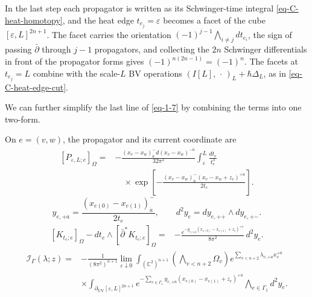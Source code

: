 \documentclass[11pt]{article}
\numberwithin{equation}{section}
\numberwithin{figure}{section}
\numberwithin{table}{section}
\begin{document}
In the last step each propagator is written as its Schwinger-time integral \eqref{eq-C-heat-homotopy}, and the heat edge $t_{e_j}=\varepsilon$ becomes a facet of the cube $[\varepsilon,L]^{2n+1}$. The facet carries the orientation $(-1)^{j-1}\bigwedge_{i\ne j}dt_{e_i}$, the sign of passing $\bar\partial$ through $j-1$ propagators, and collecting the $2n$ Schwinger differentials in front of the propagator forms gives $(-1)^{n(2n-1)}=(-1)^n$. The facets at $t_{e_j}=L$ combine with the scale-$L$ BV operations $(I[L],\,\cdot\,)_L+\hbar\Delta_L$, as in \eqref{eq-C-heat-edge-cut}.

We can further simplify the last line of \eqref{eq-1-7} by combining the terms into one two-form.

On $e=(v,w)$, the propagator and its current coordinate are
\begin{equation}\label{eq-C-explicit-propagator}
\begin{aligned}
[P_{\varepsilon,L;e}]_\Omega
={}&-\frac{(x_v-x_w)^-_{\dot a}
 d(x_v-x_w)^{-\dot a}}{32\pi^2}
 \int_\varepsilon^L\frac{dt_e}{t_e^3}\\
&\quad\times\exp\!\left[-\frac{
 (x_v-x_w)^-_{\dot a}(x_v-x_w+z_e)^{+\dot a}}{2t_e}\right].
\end{aligned}
\end{equation}
\begin{equation}\label{eq-1-8}
y_{e,+\dot a}
=\frac{(x_{e(0)}-x_{e(1)})^-_{\dot a}}{2t_e},\qquad
 d^2y_e=dy_{e,+\dot+}\wedge dy_{e,+\dot-}.
\end{equation}
\begin{equation}\label{eq-C-current-Jacobian}
\begin{aligned}
[K_{t_e;e}]_\Omega
-dt_e\wedge[\bar\partial^*K_{t_e;e}]_\Omega
={}&-\frac{e^{-y_{e,+\dot a}
 (x_{e(0)}-x_{e(1)}+z_e)^{+\dot a}}}{8\pi^2}\,d^2y_e.
\end{aligned}
\end{equation}
\begin{equation}\label{eq-kernel-current-form}
\begin{aligned}
\mathcal I_\Gamma(\lambda;z)
={}&-\frac{1}{(8\pi^2)^{n+1}}\lim_{\varepsilon\downarrow0}
\int_{(\mathbb C^2)^{n+1}}
\left(\bigwedge_{v<n+2}\Omega_v\right)
e^{\sum_{v<n+2}\lambda_{v,+\dot a}x_v^{+\dot a}}\\
&\times\int_{\partial_{\mathrm{UV}}[\varepsilon,L]^{2n+1}}
e^{-\sum_{e\in\Gamma_1}y_{e,+\dot a}(x_{e(0)}-x_{e(1)}+z_e)^{+\dot a}}
\bigwedge_{e\in\Gamma_1}d^2y_e .
\end{aligned}
\end{equation}
\end{document}

